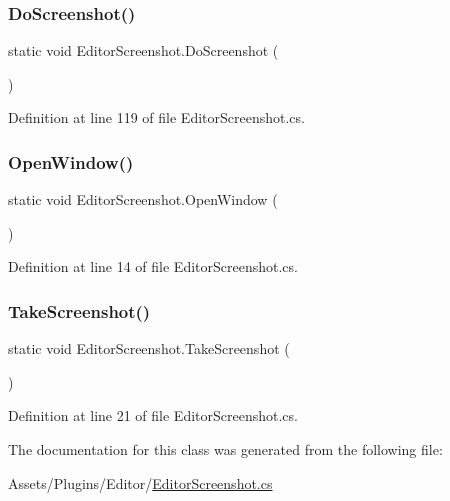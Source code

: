 \subsubsection{\texorpdfstring{Do\+Screenshot()}{DoScreenshot()}}
{\footnotesize\ttfamily static void Editor\+Screenshot.\+Do\+Screenshot (\begin{DoxyParamCaption}{ }\end{DoxyParamCaption})\hspace{0.3cm}{\ttfamily [static]}}



Definition at line 119 of file Editor\+Screenshot.\+cs.

\mbox{\label{class_editor_screenshot_aa4267b985645b4981cc2f3327f862447}} 
\subsubsection{\texorpdfstring{Open\+Window()}{OpenWindow()}}
{\footnotesize\ttfamily static void Editor\+Screenshot.\+Open\+Window (\begin{DoxyParamCaption}{ }\end{DoxyParamCaption})\hspace{0.3cm}{\ttfamily [static]}}



Definition at line 14 of file Editor\+Screenshot.\+cs.

\mbox{\label{class_editor_screenshot_a3e55a3867618ca638fdbf289161aa6f8}} 
\subsubsection{\texorpdfstring{Take\+Screenshot()}{TakeScreenshot()}}
{\footnotesize\ttfamily static void Editor\+Screenshot.\+Take\+Screenshot (\begin{DoxyParamCaption}{ }\end{DoxyParamCaption})\hspace{0.3cm}{\ttfamily [static]}}



Definition at line 21 of file Editor\+Screenshot.\+cs.



The documentation for this class was generated from the following file\+:\begin{DoxyCompactItemize}
\item 
Assets/\+Plugins/\+Editor/\mbox{\hyperlink{_editor_screenshot_8cs}{Editor\+Screenshot.\+cs}}\end{DoxyCompactItemize}
